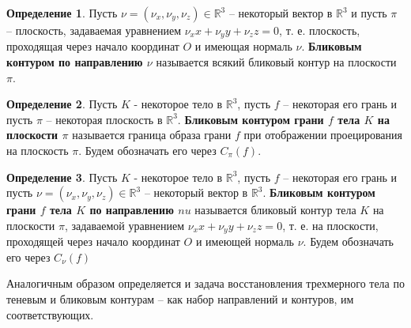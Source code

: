 \documentclass[a4paper, 12pt, titlepage]{article}
\theoremstyle{definition}
\newtheorem{SmartDefinition}{Определение}
\theoremstyle{plain}
\theoremstyle{plain}
\begin{document}
\begin{SmartDefinition}
 Пусть $\nu = (\nu_{x}, \nu_{y}, \nu_{z}) \in \mathbb{R}^{3}$ -- некоторый
 вектор в $\mathbb{R}^{3}$ и пусть $\pi$ -- плоскость, задаваемая уравнением
 $\nu_{x} x + \nu_{y} y + \nu_{z} z = 0$, т. е. плоскость, проходящая через
 начало координат $O$ и имеющая нормаль $\nu$. \textbf{Бликовым контуром по
 направлению $\nu$} называется всякий бликовый контур на плоскости $\pi$.
\end{SmartDefinition}

\begin{SmartDefinition}
 Пусть $K$ - некоторое тело в $\mathbb{R}^{3}$, пусть $f$ -- некоторая его
 грань и пусть $\pi$ -- некоторая плоскость в $\mathbb{R}^{3}$.
 \textbf{Бликовым контуром грани $f$ тела $K$ на плоскости $\pi$} называется
 граница образа грани $f$ при отображении проецирования на плоскость $\pi$.
 Будем обозначать его через $C_{\pi}(f)$.
\end{SmartDefinition}

\begin{SmartDefinition}
 Пусть $K$ - некоторое тело в $\mathbb{R}^{3}$, пусть $f$ -- некоторая его
 грань и пусть $\nu = (\nu_{x}, \nu_{y}, \nu_{z}) \in \mathbb{R}^{3}$ --
 некоторый вектор в $\mathbb{R}^{3}$.
 \textbf{Бликовым контуром грани $f$ тела $K$ по направлению  $nu$} называется
 бликовый контур тела $K$ на плоскости $\pi$, задаваемой уравнением
 $\nu_{x} x + \nu_{y} y + \nu_{z} z = 0$, т. е. на плоскости, проходящей через
 начало координат $O$ и имеющей нормаль $\nu$. Будем обозначать его через
 $C_{\nu}(f)$
\end{SmartDefinition}

Аналогичным образом определяется и задача восстановления трехмерного тела по
теневым и бликовым контурам -- как набор направлений и контуров, им
соответствующих.
\end{document}
